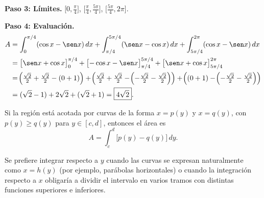 \begin{example}
\begin{myproof}
\textbf{Paso 3: Límites.}
$\bigl[0,\tfrac\pi4\bigr]$, $\bigl[\tfrac\pi4,\tfrac{5\pi}4\bigr]$,
$\bigl[\tfrac{5\pi}4,2\pi\bigr]$.

\textbf{Paso 4: Evaluación.}
\begin{align*}
  A &= \int_0^{\pi/4}(\cos x-\sen x)\,dx
     + \int_{\pi/4}^{5\pi/4}(\sen x-\cos x)\,dx
     + \int_{5\pi/4}^{2\pi}(\cos x-\sen x)\,dx \\
    &= \bigl[\sen x+\cos x\bigr]_0^{\pi/4}
     + \bigl[-\cos x-\sen x\bigr]_{\pi/4}^{5\pi/4}
     + \bigl[\sen x+\cos x\bigr]_{5\pi/4}^{2\pi} \\
    &= \!\left(\tfrac{\sqrt2}{2}+\tfrac{\sqrt2}{2}-(0+1)\right)
      +\!\left(\tfrac{\sqrt2}{2}+\tfrac{\sqrt2}{2}
          -\!\left(-\tfrac{\sqrt2}{2}-\tfrac{\sqrt2}{2}\right)\right)
      +\!\left((0+1)-\!\left(-\tfrac{\sqrt2}{2}-\tfrac{\sqrt2}{2}\right)\right)\\
    &= (\sqrt{2}-1)+2\sqrt{2}+(\sqrt{2}+1) = \boxed{4\sqrt{2}}.
\end{align*}
\end{myproof}
\end{example}

\begin{definition}
Si la región está acotada por curvas de la forma $x=p(y)$ y $x=q(y)$,
con $p(y)\geq q(y)$ para $y\in[c,d]$, entonces el área es
\[
  A = \int_c^d\bigl[p(y)-q(y)\bigr]\,dy.
\]
\end{definition}

\begin{rem}
Se prefiere integrar respecto a $y$ cuando las curvas se expresan
naturalmente como $x=h(y)$ (por ejemplo, parábolas horizontales) o cuando
la integración respecto a $x$ obligaría a dividir el intervalo en varios
tramos con distintas funciones superiores e inferiores.
\end{rem}


